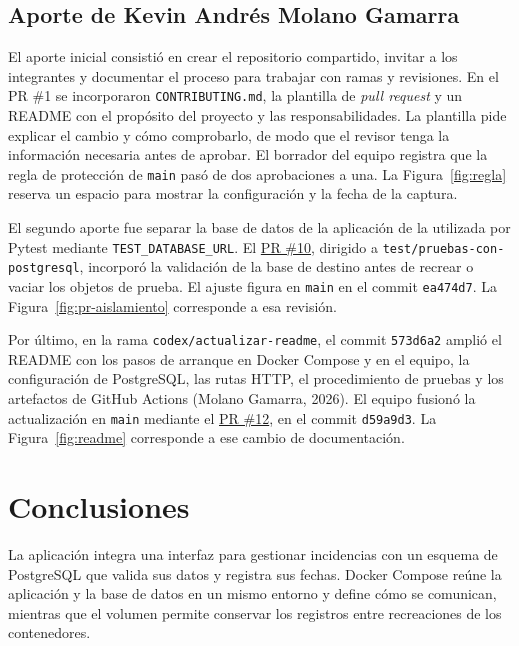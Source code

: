 \documentclass[12pt,letterpaper]{article}
\begin{document}
\subsection{Aporte de Kevin Andrés Molano Gamarra}

El aporte inicial consistió en crear el repositorio compartido, invitar a los integrantes y documentar el proceso para trabajar con ramas y revisiones. En el PR \#1 se incorporaron \texttt{CONTRIBUTING.md}, la plantilla de \textit{pull request} y un README con el propósito del proyecto y las responsabilidades. La plantilla pide explicar el cambio y cómo comprobarlo, de modo que el revisor tenga la información necesaria antes de aprobar. El borrador del equipo registra que la regla de protección de \texttt{main} pasó de dos aprobaciones a una. La Figura~\ref{fig:regla} reserva un espacio para mostrar la configuración y la fecha de la captura.

El segundo aporte fue separar la base de datos de la aplicación de la utilizada por Pytest mediante \texttt{TEST\_DATABASE\_URL}. El \href{https://github.com/kmolano-dot/gestor-incidencias/pull/10}{PR \#10}, dirigido a \texttt{test/pruebas-con-postgresql}, incorporó la validación de la base de destino antes de recrear o vaciar los objetos de prueba. El ajuste figura en \texttt{main} en el commit \texttt{ea474d7}. La Figura~\ref{fig:pr-aislamiento} corresponde a esa revisión.

Por último, en la rama \texttt{codex/actualizar-readme}, el commit \texttt{573d6a2} amplió el README con los pasos de arranque en Docker Compose y en el equipo, la configuración de PostgreSQL, las rutas HTTP, el procedimiento de pruebas y los artefactos de GitHub Actions (Molano Gamarra, 2026). El equipo fusionó la actualización en \texttt{main} mediante el \href{https://github.com/kmolano-dot/gestor-incidencias/pull/12}{PR \#12}, en el commit \texttt{d59a9d3}. La Figura~\ref{fig:readme} corresponde a ese cambio de documentación.

\section{Conclusiones}

La aplicación integra una interfaz para gestionar incidencias con un esquema de PostgreSQL que valida sus datos y registra sus fechas. Docker Compose reúne la aplicación y la base de datos en un mismo entorno y define cómo se comunican, mientras que el volumen permite conservar los registros entre recreaciones de los contenedores.
\end{document}
